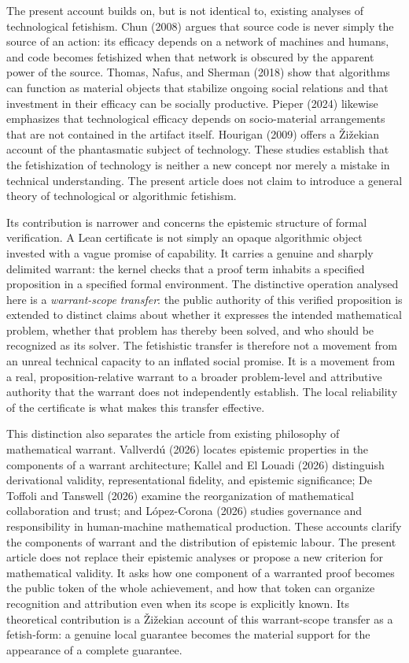 \documentclass[pdflatex,sn-apa]{sn-jnl}
\begin{document}
The present account builds on, but is not identical to, existing analyses of technological fetishism. Chun (2008) argues that source code is never simply the source of an action: its efficacy depends on a network of machines and humans, and code becomes fetishized when that network is obscured by the apparent power of the source. Thomas, Nafus, and Sherman (2018) show that algorithms can function as material objects that stabilize ongoing social relations and that investment in their efficacy can be socially productive. Pieper (2024) likewise emphasizes that technological efficacy depends on socio-material arrangements that are not contained in the artifact itself. Hourigan (2009) offers a Žižekian account of the phantasmatic subject of technology. These studies establish that the fetishization of technology is neither a new concept nor merely a mistake in technical understanding. The present article does not claim to introduce a general theory of technological or algorithmic fetishism.

Its contribution is narrower and concerns the epistemic structure of formal verification. A Lean certificate is not simply an opaque algorithmic object invested with a vague promise of capability. It carries a genuine and sharply delimited warrant: the kernel checks that a proof term inhabits a specified proposition in a specified formal environment. The distinctive operation analysed here is a \emph{warrant-scope transfer}: the public authority of this verified proposition is extended to distinct claims about whether it expresses the intended mathematical problem, whether that problem has thereby been solved, and who should be recognized as its solver. The fetishistic transfer is therefore not a movement from an unreal technical capacity to an inflated social promise. It is a movement from a real, proposition-relative warrant to a broader problem-level and attributive authority that the warrant does not independently establish. The local reliability of the certificate is what makes this transfer effective.

This distinction also separates the article from existing philosophy of mathematical warrant. Vallverdú (2026) locates epistemic properties in the components of a warrant architecture; Kallel and El Louadi (2026) distinguish derivational validity, representational fidelity, and epistemic significance; De Toffoli and Tanswell (2026) examine the reorganization of mathematical collaboration and trust; and López-Corona (2026) studies governance and responsibility in human-machine mathematical production. These accounts clarify the components of warrant and the distribution of epistemic labour. The present article does not replace their epistemic analyses or propose a new criterion for mathematical validity. It asks how one component of a warranted proof becomes the public token of the whole achievement, and how that token can organize recognition and attribution even when its scope is explicitly known. Its theoretical contribution is a Žižekian account of this warrant-scope transfer as a fetish-form: a genuine local guarantee becomes the material support for the appearance of a complete guarantee.
\end{document}
